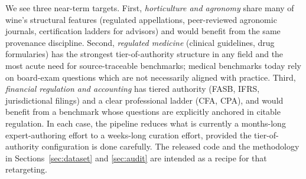We see three near-term targets. First, \emph{horticulture and
agronomy} share many of wine's structural features (regulated
appellations, peer-reviewed agronomic journals, certification ladders
for advisors) and would benefit from the same provenance discipline.
Second, \emph{regulated medicine} (clinical guidelines, drug
formularies) has the strongest tier-of-authority structure in any
field and the most acute need for source-traceable benchmarks; medical
benchmarks today rely on board-exam questions which are not
necessarily aligned with practice. Third, \emph{financial regulation
and accounting} has tiered authority (FASB, IFRS, jurisdictional
filings) and a clear professional ladder (CFA, CPA), and would benefit
from a benchmark whose questions are explicitly anchored in citable
regulation. In each case, the pipeline reduces what is currently a
months-long expert-authoring effort to a weeks-long curation effort,
provided the tier-of-authority configuration is done carefully. The
released code and the methodology in Sections~\ref{sec:dataset} and
\ref{sec:audit} are intended as a recipe for that retargeting.
